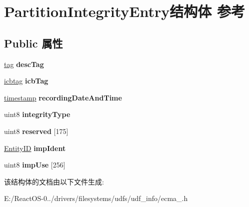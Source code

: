 \hypertarget{struct_partition_integrity_entry}{}\section{Partition\+Integrity\+Entry结构体 参考}
\label{struct_partition_integrity_entry}
\subsection*{Public 属性}
\begin{DoxyCompactItemize}
\item 
\mbox{\label{struct_partition_integrity_entry_a248eb5ac667d415848db0a4cce9c3a4c}} 
\hyperlink{structtag}{tag} {\bfseries desc\+Tag}
\item 
\mbox{\label{struct_partition_integrity_entry_a755ca38170be1ada02487e0e8c4a269e}} 
\hyperlink{structicbtag}{icbtag} {\bfseries icb\+Tag}
\item 
\mbox{\label{struct_partition_integrity_entry_a9c371a534c2009b2b9051bd9c25616f0}} 
\hyperlink{structtimestamp}{timestamp} {\bfseries recording\+Date\+And\+Time}
\item 
\mbox{\label{struct_partition_integrity_entry_a8b07df4ee45e5e87fc25626d7f143ad2}} 
uint8 {\bfseries integrity\+Type}
\item 
\mbox{\label{struct_partition_integrity_entry_a925f0e5dbe29cb8eb9277bbc71db7085}} 
uint8 {\bfseries reserved} \mbox{[}175\mbox{]}
\item 
\mbox{\label{struct_partition_integrity_entry_a9d9f0fac6a3a26149356c578f186a64f}} 
\hyperlink{struct_entity_i_d}{Entity\+ID} {\bfseries imp\+Ident}
\item 
\mbox{\label{struct_partition_integrity_entry_aa55b4500bc7fb4781a06c8164a19fccc}} 
uint8 {\bfseries imp\+Use} \mbox{[}256\mbox{]}
\end{DoxyCompactItemize}


该结构体的文档由以下文件生成\+:\begin{DoxyCompactItemize}
\item 
E\+:/\+React\+O\+S-\/0../drivers/filesystems/udfs/udf\+\_\+info/ecma\+\_.\+h\end{DoxyCompactItemize}
